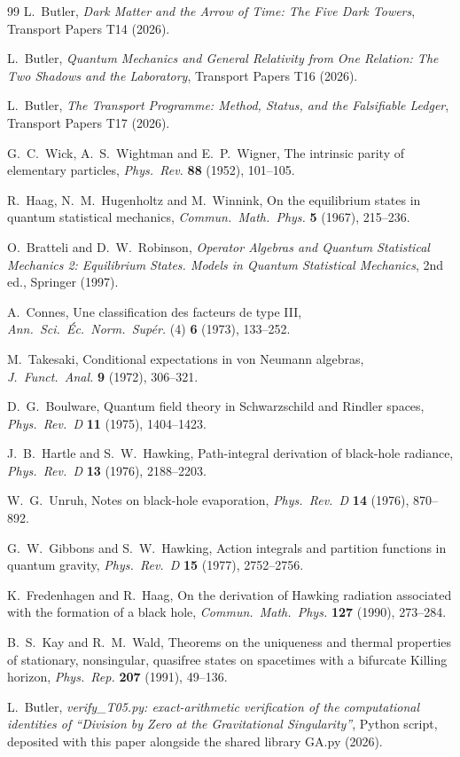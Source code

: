 \documentclass[11pt]{article}
\theoremstyle{definition}
\begin{document}
\begin{thebibliography}{99}
L.~Butler,
\emph{Dark Matter and the Arrow of Time: The Five Dark Towers},
Transport Papers T14 (2026).

L.~Butler,
\emph{Quantum Mechanics and General Relativity from One Relation: The Two Shadows and the Laboratory},
Transport Papers T16 (2026).

L.~Butler,
\emph{The Transport Programme: Method, Status, and the Falsifiable Ledger},
Transport Papers T17 (2026).

G.~C.~Wick, A.~S.~Wightman and E.~P.~Wigner,
The intrinsic parity of elementary particles,
\emph{Phys.\ Rev.} \textbf{88} (1952), 101--105.

R.~Haag, N.~M.~Hugenholtz and M.~Winnink,
On the equilibrium states in quantum statistical mechanics,
\emph{Commun.\ Math.\ Phys.} \textbf{5} (1967), 215--236.

O.~Bratteli and D.~W.~Robinson,
\emph{Operator Algebras and Quantum Statistical Mechanics 2: Equilibrium States. Models in Quantum Statistical Mechanics},
2nd ed., Springer (1997).

A.~Connes,
Une classification des facteurs de type III,
\emph{Ann.\ Sci.\ \'Ec.\ Norm.\ Sup\'er.} (4) \textbf{6} (1973), 133--252.

M.~Takesaki,
Conditional expectations in von Neumann algebras,
\emph{J.\ Funct.\ Anal.} \textbf{9} (1972), 306--321.

D.~G.~Boulware,
Quantum field theory in Schwarzschild and Rindler spaces,
\emph{Phys.\ Rev.\ D} \textbf{11} (1975), 1404--1423.

J.~B.~Hartle and S.~W.~Hawking,
Path-integral derivation of black-hole radiance,
\emph{Phys.\ Rev.\ D} \textbf{13} (1976), 2188--2203.

W.~G.~Unruh,
Notes on black-hole evaporation,
\emph{Phys.\ Rev.\ D} \textbf{14} (1976), 870--892.

G.~W.~Gibbons and S.~W.~Hawking,
Action integrals and partition functions in quantum gravity,
\emph{Phys.\ Rev.\ D} \textbf{15} (1977), 2752--2756.

K.~Fredenhagen and R.~Haag,
On the derivation of Hawking radiation associated with the formation of a black hole,
\emph{Commun.\ Math.\ Phys.} \textbf{127} (1990), 273--284.

B.~S.~Kay and R.~M.~Wald,
Theorems on the uniqueness and thermal properties of stationary, nonsingular, quasifree states on spacetimes with a bifurcate Killing horizon,
\emph{Phys.\ Rep.} \textbf{207} (1991), 49--136.

L.~Butler,
\emph{verify\_T05.py: exact-arithmetic verification of the computational identities of ``Division by Zero at the Gravitational Singularity''},
Python script, deposited with this paper alongside the shared library GA.py (2026).

\end{thebibliography}
\end{document}
